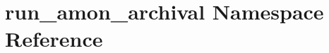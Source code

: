 \hypertarget{namespacerun__amon__archival}{\section{run\-\_\-amon\-\_\-archival Namespace Reference}
\label{namespacerun__amon__archival}
}
